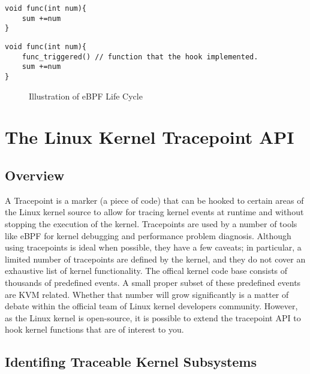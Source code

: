 \documentclass{report}
\begin{document}
\begin{spacing}{1.5}
\begin{lstlisting}[caption={Function func that is not hooked},captionpos=b]
void func(int num){
    sum +=num
}
\end{lstlisting}

\leavevmode\newline

\begin{lstlisting}[caption={Function func that is hooked},captionpos=b]
void func(int num){
    func_triggered() // function that the hook implemented.
    sum +=num
}
\end{lstlisting}
\leavevmode\newline


{}
\begin{figure}[ht]
    \hspace*{-2cm}  
    \centering
    \caption{Illustration of eBPF Life Cycle}
\end{figure}


\section{The Linux Kernel Tracepoint API}

\subsection{Overview}

{\large
A Tracepoint is a marker (a piece of code) that can be hooked to certain areas of the Linux kernel source to allow for tracing kernel events at runtime and without stopping the execution of the kernel. Tracepoints are used by a number of tools like eBPF for kernel debugging and performance problem diagnosis. Although using tracepoints is ideal when possible, they have a few caveats; in particular, a limited number of tracepoints are defined by the kernel, and they do not cover an exhaustive list of kernel functionality. The offical kernel code base consists of thousands of predefined events. A small proper subset of these predefined events are KVM related. Whether that number will grow significantly is a matter of debate within the official team of Linux kernel developers community. However, as the Linux kernel is open-source, it is possible to extend the tracepoint API to hook kernel functions that are of interest to you.
\newline
}


\subsection{Identifing Traceable Kernel Subsystems}


\end{spacing}
\end{document}
